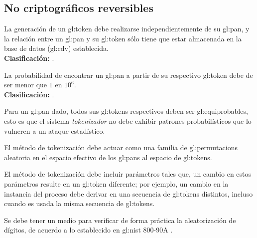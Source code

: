 %
%

\subsection{No criptográficos reversibles}

{
  La generación de un \gls{gl:token} debe realizarse independientemente de
  su \gls{gl:pan}, y la relación entre un \gls{gl:pan} y su \gls{gl:token}
  sólo tiene que estar almacenada en la base de datos (\gls{gl:cdv})
  establecida. \\
  \nopagebreak[4]
  \textbf{Clasificación:} .
}

{
  La probabilidad de encontrar un \gls{gl:pan} a partir de su respectivo
  \gls{gl:token} debe de ser menor que $1$ en $10^6$. \\
  \nopagebreak[4]
  \textbf{Clasificación:} .

  {
    Para un \gls{gl:pan} dado, todos sus \glspl{gl:token} respectivos
    deben ser \glspl{gl:equiprobable}, esto es que el sistema
    \textit{tokenizador} no debe exhibir patrones probabilísticos que
    lo vulneren a un ataque estadístico.
  }

  {
    El método de tokenización debe actuar como una familia de
    \glspl{gl:permutacion} aleatoria en el espacio efectivo de los
    \glspl{gl:pan} al espacio de \glspl{gl:token}.
  }

  {
    El método de tokenización debe incluir parámetros tales que, un
    cambio en estos parámetros resulte en un \gls{gl:token} diferente;
    por ejemplo, un cambio en la instancia del proceso debe derivar en
    una secuencia de \glspl{gl:token} distintos, incluso cuando es usada
    la misma secuencia de \glspl{gl:token}.
  }


  {
    Se debe tener un medio para verificar de forma práctica la aleatorización
    de dígitos, de acuerdo a lo establecido en \gls{gl:nist} 800-90A
    \cite{nist_aleatorios}.
  }
}

